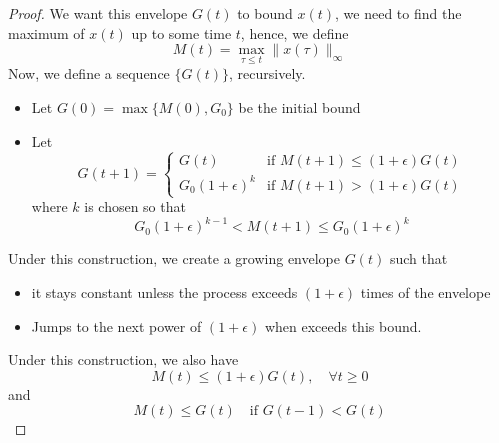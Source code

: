\begin{proof}
\noindent We want this envelope $G(t)$ to bound $x(t)$, we need to find the maximum of $x(t)$ up to some time $t$, hence, we define
\begin{equation}\label{eq:M(t)}
    M(t) = \max_{\tau\le t} \|x(\tau)\|_\infty 
\end{equation}
Now, we define a sequence $\{G(t)\}$, recursively. 
\begin{itemize}
    \item Let $G(0) = \max\{M(0), G_0\}$ be the initial bound
    \item Let 
    \begin{equation}\label{eq:updateruleofG}
           G(t+1) = \begin{cases}
        G(t) & \text{if $M(t+1)\le (1+\epsilon)G(t)$}\\
        G_0(1+\epsilon)^k &\text{if $M(t+1)>(1+\epsilon)G(t)$}
    \end{cases} 
    \end{equation}
    where $k$ is chosen so that 
    $$
    G_0(1+\epsilon)^{k-1}<M(t+1) \le G_0(1+\epsilon)^k
    $$
\end{itemize}
Under this construction, we create a growing envelope $G(t)$ such that
\begin{itemize}
    \item it stays constant unless the process exceeds $(1+\epsilon)$ times of the envelope
    \item Jumps to the next power of $(1+\epsilon)$ when exceeds this bound.
\end{itemize}
Under this construction, we also have 
\begin{equation}\label{eq:MtandGt}
    M(t)\le (1+\epsilon)G(t),\quad \forall t\ge 0
\end{equation}
and
\begin{equation}\label{eq:MtandGt2}
    M(t)\le G(t)\quad \text{if $G(t-1)<G(t)$}
\end{equation}


\end{proof}
